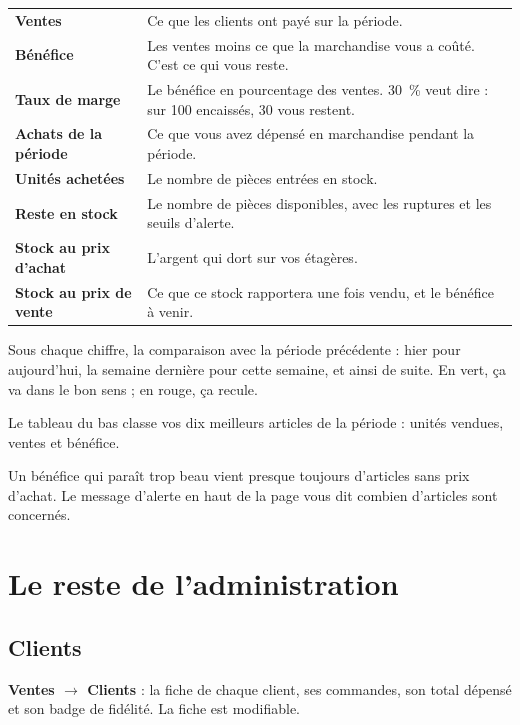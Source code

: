 \documentclass[11pt,a4paper]{article}
\newcommand{\menu}[1]{\textsf{\textbf{#1}}}
\begin{document}
\begin{center}
\begin{tabularx}{\textwidth}{@{}lX@{}}
\toprule
\textbf{Ventes} & Ce que les clients ont payé sur la période. \\
\textbf{Bénéfice} & Les ventes moins ce que la marchandise vous a coûté. C'est ce qui vous reste. \\
\textbf{Taux de marge} & Le bénéfice en pourcentage des ventes. 30~\% veut dire : sur 100 encaissés, 30 vous restent. \\
\textbf{Achats de la période} & Ce que vous avez dépensé en marchandise pendant la période. \\
\textbf{Unités achetées} & Le nombre de pièces entrées en stock. \\
\textbf{Reste en stock} & Le nombre de pièces disponibles, avec les ruptures et les seuils d'alerte. \\
\textbf{Stock au prix d'achat} & L'argent qui dort sur vos étagères. \\
\textbf{Stock au prix de vente} & Ce que ce stock rapportera une fois vendu, et le bénéfice à venir. \\
\bottomrule
\end{tabularx}
\end{center}

Sous chaque chiffre, la comparaison avec la période précédente : hier pour
aujourd'hui, la semaine dernière pour cette semaine, et ainsi de suite. En
vert, ça va dans le bon sens ; en rouge, ça recule.

Le tableau du bas classe vos dix meilleurs articles de la période : unités
vendues, ventes et bénéfice.

\begin{conseil}
Un bénéfice qui paraît trop beau vient presque toujours d'articles sans prix
d'achat. Le message d'alerte en haut de la page vous dit combien d'articles
sont concernés.
\end{conseil}

\section{Le reste de l'administration}

\subsection{Clients}
\menu{Ventes $\rightarrow$ Clients} : la fiche de chaque client, ses commandes,
son total dépensé et son badge de fidélité. La fiche est modifiable.
\end{document}
